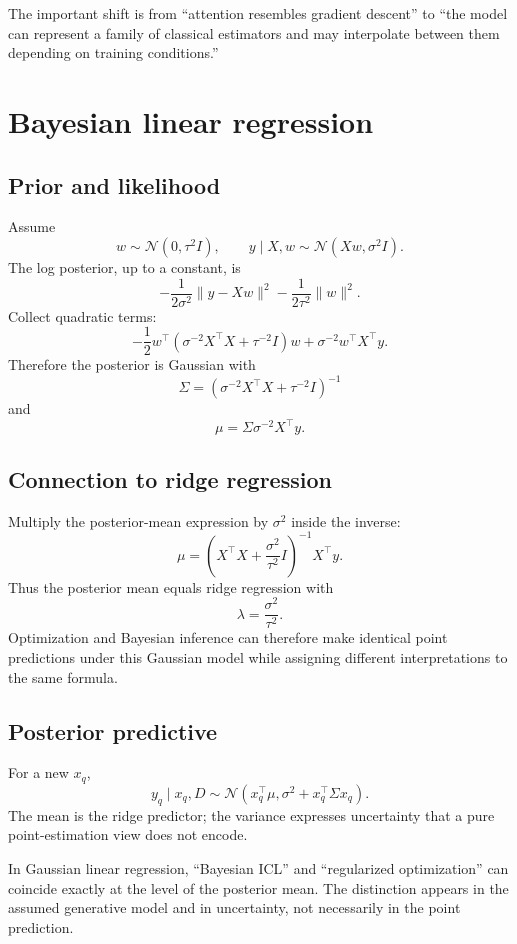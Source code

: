 \documentclass[11pt,a4paper,oneside,openany]{memoir}
\theoremstyle{definition}
\begin{document}
\begin{presentbox}
The important shift is from ``attention resembles gradient descent'' to ``the model can represent a family of classical estimators and may interpolate between them depending on training conditions.''
\end{presentbox}

\chapter{Bayesian linear regression}
\section{Prior and likelihood}
Assume
\[
w\sim\mathcal N(0,\tau^2I),
\qquad
y\mid X,w\sim\mathcal N(Xw,\sigma^2I).
\]
The log posterior, up to a constant, is
\[
-\frac1{2\sigma^2}\|y-Xw\|^2-\frac1{2\tau^2}\|w\|^2.
\]
Collect quadratic terms:
\[
-\frac12 w^\top\left(\sigma^{-2}X^\top X+\tau^{-2}I\right)w
+\sigma^{-2}w^\top X^\top y.
\]
Therefore the posterior is Gaussian with
\[
\boxed{\Sigma
=\left(\sigma^{-2}X^\top X+\tau^{-2}I\right)^{-1}}
\]
and
\[
\boxed{\mu=\Sigma\sigma^{-2}X^\top y.}
\]

\section{Connection to ridge regression}
Multiply the posterior-mean expression by $\sigma^2$ inside the inverse:
\[
\mu
=\left(X^\top X+\frac{\sigma^2}{\tau^2}I\right)^{-1}X^\top y.
\]
Thus the posterior mean equals ridge regression with
\[
\lambda=\frac{\sigma^2}{\tau^2}.
\]
Optimization and Bayesian inference can therefore make identical point predictions under this Gaussian model while assigning different interpretations to the same formula.

\section{Posterior predictive}
For a new $x_q$,
\[
y_q\mid x_q,D
\sim\mathcal N\left(x_q^\top\mu,
\sigma^2+x_q^\top\Sigma x_q\right).
\]
The mean is the ridge predictor; the variance expresses uncertainty that a pure point-estimation view does not encode.

\begin{presentbox}
In Gaussian linear regression, ``Bayesian ICL'' and ``regularized optimization'' can coincide exactly at the level of the posterior mean.  The distinction appears in the assumed generative model and in uncertainty, not necessarily in the point prediction.
\end{presentbox}
\end{document}
